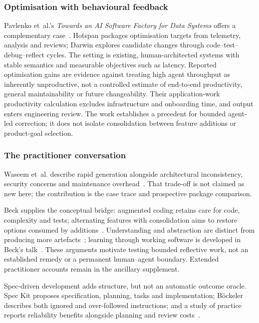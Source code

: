 \subsubsection{Optimisation with behavioural feedback}\label{sup:sec:factory}

Pavlenko et~al.'s \emph{Towards an AI Software Factory for Data Systems}
offers a complementary case~\cite{pavlenko2026factory}. Hotspan packages
optimisation targets from telemetry, analysis and reviews; Darwin explores
candidate changes through code--test--debug--reflect cycles. The setting is
existing, human-architected systems with stable semantics and measurable
objectives such as latency. Reported optimisation gains are evidence against
treating high agent throughput as inherently unproductive, not a controlled
estimate of end-to-end productivity, general maintainability or future
changeability. Their application-work productivity calculation excludes
infrastructure and onboarding time, and output enters engineering review.
The work establishes a precedent for bounded agent-led correction; it does
not isolate consolidation between feature additions or product-goal selection.

\subsubsection{The practitioner conversation}\label{sup:sec:practitioners}

Waseem et~al. describe rapid generation alongside architectural inconsistency,
security concerns and maintenance overhead~\cite{waseem2025vibe}. That trade-off
is not claimed as new here; the contribution is the case trace and prospective
package comparison.

Beck supplies the conceptual bridge: augmented coding retains care for code,
complexity and tests; alternating features with consolidation aims to restore
options consumed by additions~\cite{beck2025augmented,beck2026prodacity,beck2025devslow}.
Understanding and abstraction are distinct from producing more
artefacts~\cite{beck2026mathematicians}; learning through working software
is developed in Beck's talk~\cite{beck2026prodacity}. These arguments motivate testing
bounded reflective work, not an established remedy or a permanent human--agent
boundary. Extended practitioner accounts remain in the ancillary supplement.

Spec-driven development adds structure, but not an automatic outcome oracle.
Spec Kit proposes specification, planning, tasks and implementation;
B\"ockeler describes both ignored and over-followed instructions; and a study
of practice reports reliability benefits alongside planning and review
costs~\cite{delimarsky2025speckit,boeckeler2025sdd,agarwal2026sdd}.

